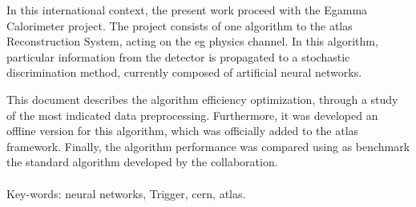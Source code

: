 In this international context, the present work proceed with the Egamma
Calorimeter project. The project consists of one algorithm to the
\gls{atlas} Reconstruction System, acting on the \acrshort{eg} physics channel. In this
algorithm, particular information from the detector is propagated to a stochastic
discrimination method, currently composed of artificial neural networks.

This document describes the algorithm efficiency optimization, through a study
of the most indicated data preprocessing. Furthermore, it was developed an
offline version for this algorithm, which was officially added to the
\gls{atlas} framework. Finally, the algorithm performance was compared using as benchmark
the standard algorithm developed by the collaboration.


\paragraph{}

\noindent Key-words: neural networks, Trigger, \acrshort{cern}, \acrshort{atlas}.


\vfill
